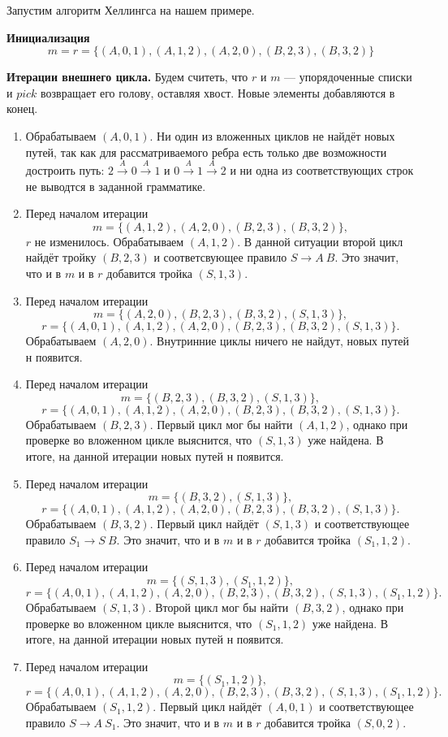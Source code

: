 \begin{example}
  Запустим алгоритм Хеллингса на нашем примере.

  \textbf{Инициализация}
  $$
  m = r = \{(A,0,1),(A,1,2),(A,2,0),(B,2,3),(B,3,2)\}
  $$

  \textbf{Итерации внешнего цикла.} Будем считеть, что $r$ и $m$ --- упорядоченные списки и $pick$ возвращает его голову, оставляя хвост.
  Новые элементы добавляются в конец.
  \begin{enumerate}
  \item Обрабатываем $(A,0,1)$.
  Ни один из вложенных циклов не найдёт новых путей, так как для рассматриваемого ребра есть только две возможности достроить путь: $2 \xrightarrow{A} 0 \xrightarrow{A} 1$ и $0 \xrightarrow{A} 1 \xrightarrow{A} 2$
  и ни одна из соответствующих строк не выводтся в заданной грамматике.
  \item Перед началом итерации
     $$
     m = \{(A,1,2),(A,2,0),(B,2,3),(B,3,2)\},
     $$ $r$ не изменилось.
     Обрабатываем $(A,1,2)$.
     В данной ситуации второй цикл найдёт тройку $(B,2,3)$ и соответсвующее правило $S \to A \ B$.
     Это значит, что и в $m$ и в $r$ добавится тройка $(S, 1, 3)$.
  \item
   Перед началом итерации
     $$
     m = \{(A,2,0),(B,2,3),(B,3,2),(S,1,3)\},
     $$
     $$
     r= \{(A,0,1),(A,1,2),(A,2,0),(B,2,3),(B,3,2),(S,1,3)\}.
     $$
     Обрабатываем $(A,2,0)$.
     Внутринние циклы ничего не найдут, новых путей н появится.
   \item
   Перед началом итерации
     $$
     m = \{(B,2,3),(B,3,2),(S,1,3)\},
     $$
     $$
     r= \{(A,0,1),(A,1,2),(A,2,0),(B,2,3),(B,3,2),(S,1,3)\}.
     $$
     Обрабатываем $(B,2,3)$.
     Первый цикл мог бы найти $(A,1,2)$, однако при проверке во вложенном цикле выяснится, что $(S, 1, 3)$ уже найдена.
     В итоге, на данной итерации новых путей н появится.
   \item
   Перед началом итерации
     $$
     m = \{(B,3,2),(S,1,3)\},
     $$
     $$
     r= \{(A,0,1),(A,1,2),(A,2,0),(B,2,3),(B,3,2),(S,1,3)\}.
     $$
     Обрабатываем $(B,3,2)$.
     Первый цикл найдёт $(S,1,3)$ и соответствующее правило $S_1 \to S \ B$.
     Это значит, что и в $m$ и в $r$ добавится тройка $(S_1, 1, 2)$.
   \item
   Перед началом итерации
     $$
     m = \{(S,1,3),(S_1, 1, 2)\},
     $$
     $$
     r= \{(A,0,1),(A,1,2),(A,2,0),(B,2,3),(B,3,2),(S,1,3),(S_1, 1, 2)\}.
     $$
     Обрабатываем $(S,1,3)$.
     Второй цикл мог бы найти $(B,3,2)$, однако при проверке во вложенном цикле выяснится, что $(S_1, 1, 2)$ уже найдена.
     В итоге, на данной итерации новых путей н появится.
   \item
   Перед началом итерации
     $$
     m = \{(S_1, 1, 2)\},
     $$
     $$
     r= \{(A,0,1),(A,1,2),(A,2,0),(B,2,3),(B,3,2),(S,1,3),(S_1, 1, 2)\}.
     $$
     Обрабатываем $(S_1,1,2)$.
     Первый цикл найдёт $(A,0,1)$ и соответствующее правило $S \to A \ S_1$.
     Это значит, что и в $m$ и в $r$ добавится тройка $(S, 0, 2)$.


\end{enumerate}
\end{example}
